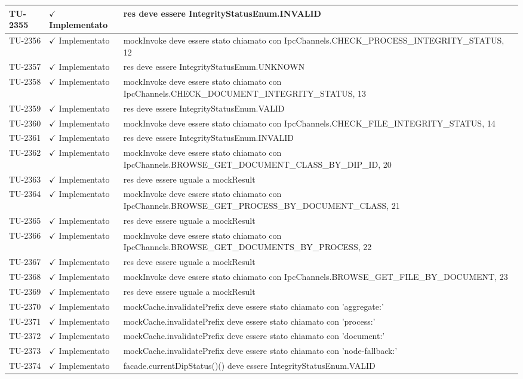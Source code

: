 ﻿\documentclass[a4paper,12pt]{article}
\newcommand{\ok}{\textcolor{green!60!black}{$\checkmark$ Implementato}}
\begin{document}
\begin{longtable}{|p{2cm}|p{3.5cm}|p{9.5cm}|}
\hline
TU-2355 & \ok & res deve essere IntegrityStatusEnum.INVALID \\
\hline
TU-2356 & \ok & mockInvoke deve essere stato chiamato con IpcChannels.CHECK\_PROCESS\_INTEGRITY\_STATUS, 12 \\
\hline
TU-2357 & \ok & res deve essere IntegrityStatusEnum.UNKNOWN \\
\hline
TU-2358 & \ok & mockInvoke deve essere stato chiamato con IpcChannels.CHECK\_DOCUMENT\_INTEGRITY\_STATUS, 13 \\
\hline
TU-2359 & \ok & res deve essere IntegrityStatusEnum.VALID \\
\hline
TU-2360 & \ok & mockInvoke deve essere stato chiamato con IpcChannels.CHECK\_FILE\_INTEGRITY\_STATUS, 14 \\
\hline
TU-2361 & \ok & res deve essere IntegrityStatusEnum.INVALID \\
\hline
TU-2362 & \ok & mockInvoke deve essere stato chiamato con IpcChannels.BROWSE\_GET\_DOCUMENT\_CLASS\_BY\_DIP\_ID, 20 \\
\hline
TU-2363 & \ok & res deve essere uguale a mockResult \\
\hline
TU-2364 & \ok & mockInvoke deve essere stato chiamato con IpcChannels.BROWSE\_GET\_PROCESS\_BY\_DOCUMENT\_CLASS, 21 \\
\hline
TU-2365 & \ok & res deve essere uguale a mockResult \\
\hline
TU-2366 & \ok & mockInvoke deve essere stato chiamato con IpcChannels.BROWSE\_GET\_DOCUMENTS\_BY\_PROCESS, 22 \\
\hline
TU-2367 & \ok & res deve essere uguale a mockResult \\
\hline
TU-2368 & \ok & mockInvoke deve essere stato chiamato con IpcChannels.BROWSE\_GET\_FILE\_BY\_DOCUMENT, 23 \\
\hline
TU-2369 & \ok & res deve essere uguale a mockResult \\
\hline
TU-2370 & \ok & mockCache.invalidatePrefix deve essere stato chiamato con 'aggregate:' \\
\hline
TU-2371 & \ok & mockCache.invalidatePrefix deve essere stato chiamato con 'process:' \\
\hline
TU-2372 & \ok & mockCache.invalidatePrefix deve essere stato chiamato con 'document:' \\
\hline
TU-2373 & \ok & mockCache.invalidatePrefix deve essere stato chiamato con 'node-fallback:' \\
\hline
TU-2374 & \ok & facade.currentDipStatus()() deve essere IntegrityStatusEnum.VALID \\

\end{longtable}
\end{document}
